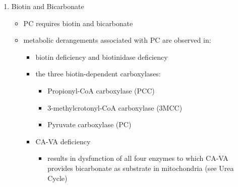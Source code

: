\documentclass{scrartcl}
\begin{document}
\begin{enumerate}
\item Biotin and Bicarbonate
\label{sec:orgcf455b8}
\begin{itemize}
\item PC requires biotin and bicarbonate
\item metabolic derangements associated with PC are observed in:
\begin{itemize}
\item biotin deficiency and biotinidase deficiency
\item the three biotin-dependent carboxylases:
\begin{itemize}
\item Propionyl-CoA carboxylase (PCC)
\item 3-methylcrotonyl-CoA carboxylase (3MCC)
\item Pyruvate carboxylase (PC)
\end{itemize}

\item CA-VA deficiency
\begin{itemize}
\item results in dysfunction of all four enzymes to which CA-VA
provides bicarbonate as substrate in mitochondria (see Urea Cycle)
\end{itemize}
\end{itemize}
\end{itemize}


\end{enumerate}
\end{document}
